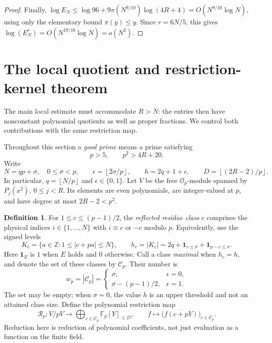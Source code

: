 \documentclass[11pt,letterpaper]{article}
\theoremstyle{definition}
\newtheorem{definition}[definition]{Definition}
\newcommand{\Z}{\mathbb Z}
\newcommand{\Fp}{\mathbb F_p}
\newcommand{\floor}[1]{\left\lfloor #1\right\rfloor}
\begin{document}
\begin{proof}
Finally,
$\log E_N\le\log96+9\pi(N^{9/10})\log(4R+4)
=O(N^{9/10}\log N)$, using only the elementary bound $\pi(y)\le y$.
Since $r=6N/5$, this gives
$\log(E_N^r)=O(N^{19/10}\log N)=o(N^2)$.
\end{proof}


\section{The local quotient and restriction-kernel theorem}\label{sec:local-kernel}

The main local estimate must accommodate $R>N$: the entries then have
nonconstant polynomial quotients as well as proper fractions. We control
both contributions with the same restriction map.

Throughout this section a \emph{good prime} means a prime satisfying
\begin{equation}\label{eq:good-prime}
 p>5,\qquad p^2>4R+20.
\end{equation}
Write
\begin{equation}\label{eq:local-parameters}
 N=qp+\sigma,\quad 0\le\sigma<p,\qquad
 \epsilon=\floor{2\sigma/p},\qquad
 h=2q+1+\epsilon,\qquad D=\floor{(2R-2)/p}.
\end{equation}
In particular, $q=\floor{N/p}$ and $\epsilon\in\{0,1\}$.
Let $V$ be the free $\mathcal O_p$-module spanned by
$P_j(x^2)$, $0\le j<R$. Its elements are even polynomials, are
integer-valued at $p$, and have degree at most $2R-2<p^2$.

\begin{definition}\label{def:restriction-map}
For $1\le c\le(p-1)/2$, the \emph{reflected residue class} $c$ comprises
the physical indices $i\in\{1,\ldots,N\}$ with $i\equiv c$ or $-c$
modulo $p$. Equivalently, use the signed levels
\[
 K_c=\{a\in\Z:1\le |c+pa|\le N\},\qquad
 h_c=|K_c|=2q+\mathbf1_{c\le\sigma}+\mathbf1_{p-c\le\sigma}.
\]
Here $\mathbf1_E$ is $1$ when $E$ holds and $0$ otherwise.
Call a class \emph{maximal} when $h_c=h$, and denote the set of these
classes by $\mathcal C_p$. Their number is
\begin{equation}\label{eq:maximal-class-count}
 w_p=|\mathcal C_p|=
 \begin{cases}
 \sigma,&\epsilon=0,\\
 \sigma-(p-1)/2,&\epsilon=1.
 \end{cases}
\end{equation}
The set may be empty; when $\sigma=0$, the value $h$ is an upper
threshold and not an attained class size. Define the polynomial restriction
map
\begin{equation}\label{eq:restriction-map}
 \mathcal R_p:V/pV\longrightarrow
       \bigoplus_{c\in\mathcal C_p}\Fp[Y]_{\le D},\qquad
 \overline f\longmapsto
       \bigl(\overline{f(c+pY)}\bigr)_{c\in\mathcal C_p}.
\end{equation}
Reduction here is reduction of polynomial coefficients, not just evaluation as a function on the finite field.
\end{definition}
\end{document}

